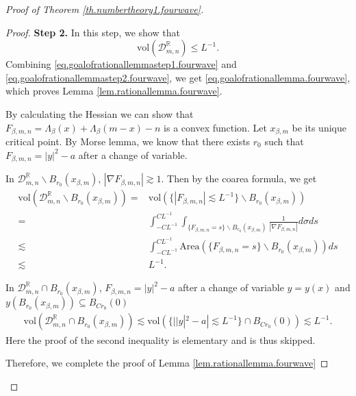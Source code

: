 \begin{proof}[Proof of Theorem \ref{th.numbertheory1.fourwave}]
\begin{proof}
\textbf{Step 2.} In this step, we show that 
\begin{equation}\label{eq.goalofrationallemmastep2.fourwave}
    \text{vol}(\mathcal{D}^{\mathbb{R}}_{m,n})\le L^{-1}.
\end{equation}
Combining \eqref{eq.goalofrationallemmastep1.fourwave} and \eqref{eq.goalofrationallemmastep2.fourwave}, we get
\eqref{eq.goalofrationallemma.fourwave}, which proves Lemma \ref{lem.rationallemma.fourwave}.


By calculating the Hessian we can show that $F_{\beta,m,n}=\Lambda_{\beta}(x)+\Lambda_{\beta}(m-x)-n$ is a convex function. Let $x_{\beta, m}$ be its unique critical point. By Morse lemma, we know that there exists $r_0$ such that $F_{\beta,m,n}=|y|^2-a$ after a change of variable.

In $\mathcal{D}^{\mathbb{R}}_{m,n}\backslash B_{r_0}(x_{\beta, m})$, $|\nabla F_{\beta,m,n}|\gtrsim 1$. Then by the coarea formula, we get
\begin{equation}
\begin{split}
    \text{vol}(\mathcal{D}^{\mathbb{R}}_{m,n}\backslash B_{r_0}(x_{\beta, m})) =&  \text{vol}(\{|F_{\beta,m,n}|\lesssim L^{-1}\}\backslash B_{r_0}(x_{\beta, m}))
    \\
    =& \int^{CL^{-1}}_{-CL^{-1}} \int_{\{F_{\beta,m,n}=s\}\backslash B_{r_0}(x_{\beta, m})}\frac{1}{|\nabla F_{\beta,m,n}|}d\sigma ds
    \\
    \lesssim& \int^{CL^{-1}}_{-CL^{-1}} \text{Area}(\{F_{\beta,m,n}=s\}\backslash B_{r_0}(x_{\beta, m})) ds
    \\
    \lesssim& L^{-1}.
\end{split}
\end{equation}

In $\mathcal{D}^{\mathbb{R}}_{m,n}\cap  B_{r_0}(x_{\beta, m})$, $F_{\beta,m,n}=|y|^2-a$ after a change of variable $y=y(x)$ and $y(B_{r_0}(x_{\beta, m}))\subseteq B_{Cr_0}(0)$ 
\begin{equation}
\begin{split}
    \text{vol}(\mathcal{D}^{\mathbb{R}}_{m,n}\cap B_{r_0}(x_{\beta, m})) \lesssim \text{vol}(\{||y|^2-a|\lesssim L^{-1}\}\cap B_{Cr_0}(0))\lesssim L^{-1}.
\end{split}
\end{equation}
Here the proof of the second inequality is elementary and is thus skipped. 

Therefore, we complete the proof of Lemma \ref{lem.rationallemma.fourwave}
\end{proof}


\end{proof}
